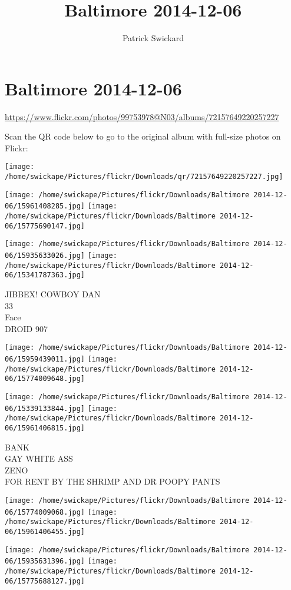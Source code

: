 \documentclass[10pt,letterpaper]{article}
\title{Baltimore 2014-12-06}
\author{Patrick Swickard}
\date{}
\begin{document}
\section*{Baltimore 2014-12-06}

\url{https://www.flickr.com/photos/99753978@N03/albums/72157649220257227}

Scan the QR code below to go to the original album with full-size photos on Flickr:

\texttt{[image: /home/swickape/Pictures/flickr/Downloads/qr/72157649220257227.jpg]}
\pagebreak

\texttt{[image: /home/swickape/Pictures/flickr/Downloads/Baltimore 2014-12-06/15961408285.jpg]}
\texttt{[image: /home/swickape/Pictures/flickr/Downloads/Baltimore 2014-12-06/15775690147.jpg]}

\texttt{[image: /home/swickape/Pictures/flickr/Downloads/Baltimore 2014-12-06/15935633026.jpg]}
\texttt{[image: /home/swickape/Pictures/flickr/Downloads/Baltimore 2014-12-06/15341787363.jpg]}

JIBBEX! COWBOY DAN\\
33\\
Face\\
DROID 907
\pagebreak

\texttt{[image: /home/swickape/Pictures/flickr/Downloads/Baltimore 2014-12-06/15959439011.jpg]}
\texttt{[image: /home/swickape/Pictures/flickr/Downloads/Baltimore 2014-12-06/15774009648.jpg]}

\texttt{[image: /home/swickape/Pictures/flickr/Downloads/Baltimore 2014-12-06/15339133844.jpg]}
\texttt{[image: /home/swickape/Pictures/flickr/Downloads/Baltimore 2014-12-06/15961406815.jpg]}

BANK\\
GAY WHITE ASS\\
ZENO\\
FOR RENT BY THE SHRIMP AND DR POOPY PANTS
\pagebreak

\texttt{[image: /home/swickape/Pictures/flickr/Downloads/Baltimore 2014-12-06/15774009068.jpg]}
\texttt{[image: /home/swickape/Pictures/flickr/Downloads/Baltimore 2014-12-06/15961406455.jpg]}

\texttt{[image: /home/swickape/Pictures/flickr/Downloads/Baltimore 2014-12-06/15935631396.jpg]}
\texttt{[image: /home/swickape/Pictures/flickr/Downloads/Baltimore 2014-12-06/15775688127.jpg]}
\end{document}

